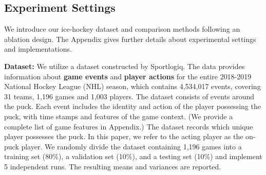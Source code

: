\documentclass{article}
\begin{document}
\subsection{Experiment Settings}
We introduce our ice-hockey dataset and comparison methods following an ablation design. The Appendix gives further details about experimental settings and implementations. 

{\bf Dataset:} We utilize a dataset constructed by Sportlogiq.
The data provides information about \textbf{game events} and \textbf{player actions} for the entire 2018-2019 National Hockey League (NHL) season,
which contains 4,534,017 events, covering 31 teams, 1,196 games and 1,003 players. 
The dataset consists of events around the puck. Each event includes the identity and action of the player possessing the puck, with time stamps and features of the game context. (We provide a complete list of game features in Appendix.)
The dataset records which unique player possesses the puck. 
In this paper, we refer to the acting player as the on-puck player. 
We randomly divide the dataset containing 1,196 games into a training set (80\%), a validation set (10\%), and a testing set (10\%) and implement 5 independent runs. The resulting means and variances are reported.
\end{document}
